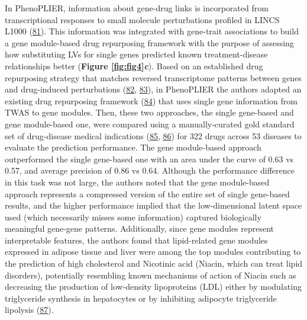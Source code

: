 In PhenoPLIER, information about gene-drug links is incorporated from transcriptional responses to small molecule perturbations profiled in LINCS L1000 (\protect\hyperlink{ref-F7lIlh2N}{81}).
This information was integrated with gene-trait associations to build a gene module-based drug repurposing framework with the purpose of assessing how substituting LVs for single genes predicted known treatment-disease relationships better (\textbf{Figure \ref{fig:fig4}\emph{c}}).
Based on an established drug repurposing strategy that matches reversed transcriptome patterns between genes and drug-induced perturbations (\protect\hyperlink{ref-1ClBKizD7}{82}, \protect\hyperlink{ref-mZjkE1xU}{83}), in PhenoPLIER the authors adapted an existing drug repurposing framework (\protect\hyperlink{ref-17oeJ0CXy}{84}) that uses single gene information from TWAS to gene modules.
Then, these two approaches, the single gene-based and gene module-based one, were compared using a manually-curated gold standard set of drug-disease medical indications (\protect\hyperlink{ref-O21tn8vf}{85}, \protect\hyperlink{ref-10KA5jTBQ}{86}) for 322 drugs across 53 diseases to evaluate the prediction performance.
The gene module-based approach outperformed the single gene-based one with an area under the curve of 0.63 vs 0.57, and average precision of 0.86 vs 0.64.
Although the performance difference in this task was not large, the authors noted that the gene module-based approach represents a compressed version of the entire set of single gene-based results, and the higher performance implied that the low-dimensional latent space used (which necessarily misses some information) captured biologically meaningful gene-gene patterns.
Additionally, since gene modules represent interpretable features, the authors found that lipid-related gene modules expressed in adipose tissue and liver were among the top modules contributing to the prediction of high cholesterol and Nicotinic acid (Niacin, which can treat lipid disorders), potentially resembling known mechanisms of action of Niacin such as decreasing the production of low-density lipoproteins (LDL) either by modulating triglyceride synthesis in hepatocytes or by inhibiting adipocyte triglyceride lipolysis (\protect\hyperlink{ref-LVihFr3g}{87}).

